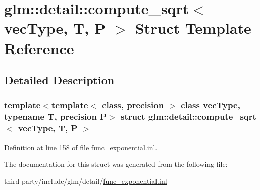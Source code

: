 \hypertarget{structglm_1_1detail_1_1compute__sqrt}{}\section{glm\+:\+:detail\+:\+:compute\+\_\+sqrt$<$ vec\+Type, T, P $>$ Struct Template Reference}
\label{structglm_1_1detail_1_1compute__sqrt}


\subsection{Detailed Description}
\subsubsection*{template$<$template$<$ class, precision $>$ class vec\+Type, typename T, precision P$>$\newline
struct glm\+::detail\+::compute\+\_\+sqrt$<$ vec\+Type, T, P $>$}



Definition at line 158 of file func\+\_\+exponential.\+inl.



The documentation for this struct was generated from the following file\+:\begin{DoxyCompactItemize}
\item 
third-\/party/include/glm/detail/\hyperlink{func__exponential_8inl}{func\+\_\+exponential.\+inl}\end{DoxyCompactItemize}
